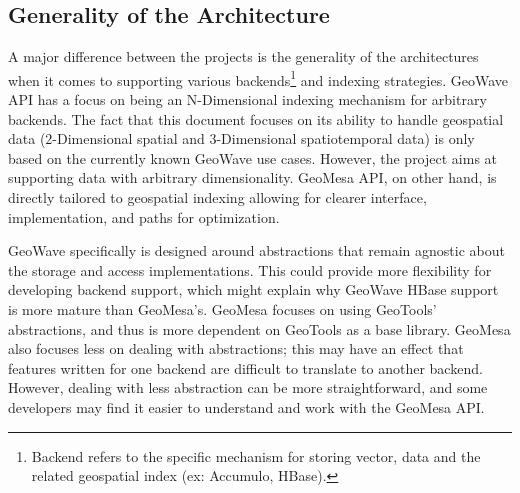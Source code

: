 \subsection{Generality of the Architecture}
\label{sec:featurecompare:generality}

A major difference between the projects is the generality of the architectures when it comes to supporting
various backends\footnote{Backend refers to the specific mechanism for storing vector, data and the related geospatial index (ex: Accumulo, HBase).}
and indexing strategies.
GeoWave API has a focus on being an N-Dimensional indexing mechanism for arbitrary backends.
The fact that this document focuses on its ability to handle geospatial data ($2$-Dimensional spatial and $3$-Dimensional spatiotemporal data) is only based on the currently known GeoWave use cases.
However, the project aims at supporting data with arbitrary dimensionality.
GeoMesa API, on other hand, is directly tailored to geospatial indexing allowing for clearer interface, implementation, and paths for optimization.

GeoWave specifically is designed around abstractions that remain agnostic about the storage and access implementations.
This could provide more flexibility for developing backend support, which might explain why GeoWave HBase support is more mature than GeoMesa's.
GeoMesa focuses on using GeoTools' abstractions, and thus is more dependent on GeoTools as a base library.
GeoMesa also focuses less on dealing with abstractions; this may have an effect that features written for one backend are difficult to translate to another backend.
However, dealing with less abstraction can be more straightforward, and some developers may find it easier to understand and work with the GeoMesa API.
